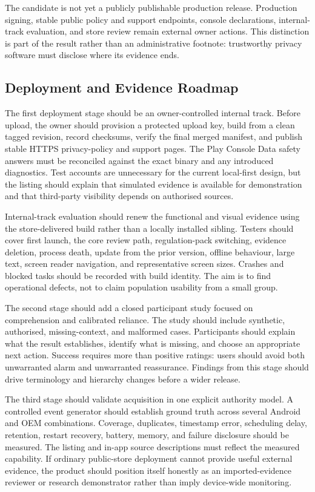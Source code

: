 The candidate is not yet a publicly publishable production release. Production signing, stable public policy and support endpoints, console declarations, internal-track evaluation, and store review remain external owner actions. This distinction is part of the result rather than an administrative footnote: trustworthy privacy software must disclose where its evidence ends.

\subsection{Deployment and Evidence Roadmap}

The first deployment stage should be an owner-controlled internal track. Before upload, the owner should provision a protected upload key, build from a clean tagged revision, record checksums, verify the final merged manifest, and publish stable HTTPS privacy-policy and support pages. The Play Console Data safety answers must be reconciled against the exact binary and any introduced diagnostics. Test accounts are unnecessary for the current local-first design, but the listing should explain that simulated evidence is available for demonstration and that third-party visibility depends on authorised sources.

Internal-track evaluation should renew the functional and visual evidence using the store-delivered build rather than a locally installed sibling. Testers should cover first launch, the core review path, regulation-pack switching, evidence deletion, process death, update from the prior version, offline behaviour, large text, screen reader navigation, and representative screen sizes. Crashes and blocked tasks should be recorded with build identity. The aim is to find operational defects, not to claim population usability from a small group.

The second stage should add a closed participant study focused on comprehension and calibrated reliance. The study should include synthetic, authorised, missing-context, and malformed cases. Participants should explain what the result establishes, identify what is missing, and choose an appropriate next action. Success requires more than positive ratings: users should avoid both unwarranted alarm and unwarranted reassurance. Findings from this stage should drive terminology and hierarchy changes before a wider release.

The third stage should validate acquisition in one explicit authority model. A controlled event generator should establish ground truth across several Android and OEM combinations. Coverage, duplicates, timestamp error, scheduling delay, retention, restart recovery, battery, memory, and failure disclosure should be measured. The listing and in-app source descriptions must reflect the measured capability. If ordinary public-store deployment cannot provide useful external evidence, the product should position itself honestly as an imported-evidence reviewer or research demonstrator rather than imply device-wide monitoring.

